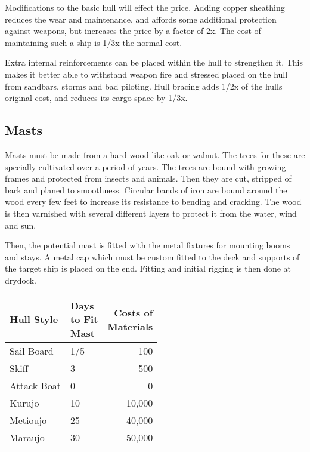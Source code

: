Modifications to the basic hull will effect the price. Adding copper sheathing reduces the wear and maintenance, and affords some additional protection against weapons, but increases the price by a factor of 2x. The cost of maintaining such a ship is 1/3x the normal cost.

Extra internal reinforcements can be placed within the hull to strengthen it. This makes it better able to withstand weapon fire and stressed placed on the hull from sandbars, storms and bad piloting. Hull bracing adds 1/2x of the hulls original cost, and reduces its cargo space by 1/3x.
\subsection{Masts}
Masts must be made from a hard wood like oak or walnut. The trees for these are specially cultivated over a period of years. The trees are bound with growing frames and
protected from insects and animals. Then they are cut, stripped of bark and planed to smoothness. Circular bands of iron are bound around the wood every few feet to increase its
resistance to bending and cracking. The wood is then varnished with several different layers to protect it from the water, wind and sun.

Then, the potential mast is fitted with the metal fixtures for mounting booms and stays. A metal cap which must be custom fitted to the deck and supports of the target ship is placed on the end. Fitting and initial rigging is then done at drydock.

\begin{normbox}
\small
\begin{tabular}{@{}llr}
Hull Style & \makecell[lt]{Days\\to Fit\\Mast} & \makecell[lt]{Costs of\\Materials}\\
\midrule
Sail Board & 1/5 & 100\\
Skiff & 3 & 500\\
Attack Boat & 0 & 0\\
Kurujo & 10 & 10,000\\
Metioujo & 25 & 40,000\\
Maraujo & 30 & 50,000\\
\end{tabular}
\end{normbox}

